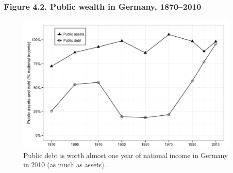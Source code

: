 \documentclass[t]{beamer}\usepackage[]{graphicx}\usepackage[]{color}
\newenvironment{knitrout}{}{} %
\begin{document}
\begin{frame}[label=Figure_4_2]
\frametitle{Figure 4.2. Public wealth in Germany, 1870--2010}
\begin{figure}[t]
\begin{minipage}[b]{\textwidth}
\centering
\begin{knitrout}\footnotesize
{}\color{fgcolor}

{\centering \includegraphics[width=1\linewidth]{figures/bw/Figure_4_2} 

}



\end{knitrout}
\caption{Public debt is worth almost one year of national income in Germany in 2010 (as much as assets).}
\end{minipage}
\end{figure}
\end{frame}
\end{document}
